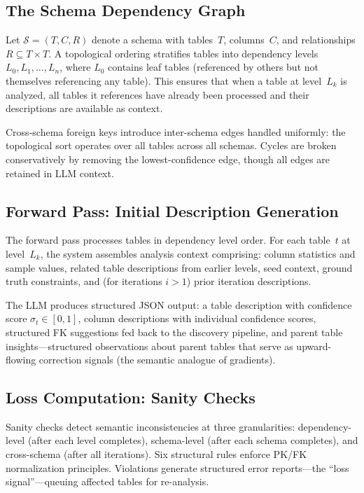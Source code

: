 \documentclass[twocolumn]{svjour3}
\begin{document}
\subsection{The Schema Dependency Graph}

Let $\mathcal{S} = (T, C, R)$ denote a schema with tables~$T$, columns~$C$, and relationships $R \subseteq T \times T$. A topological ordering stratifies tables into dependency levels $L_0, L_1, \ldots, L_n$, where $L_0$ contains leaf tables (referenced by others but not themselves referencing any table). This ensures that when a table at level~$L_k$ is analyzed, all tables it references have already been processed and their descriptions are available as context.

Cross-schema foreign keys introduce inter-schema edges handled uniformly: the topological sort operates over all tables across all schemas. Cycles are broken conservatively by removing the lowest-confidence edge, though all edges are retained in LLM context.

\subsection{Forward Pass: Initial Description Generation}

The forward pass processes tables in dependency level order. For each table~$t$ at level~$L_k$, the system assembles analysis context comprising: column statistics and sample values, related table descriptions from earlier levels, seed context, ground truth constraints, and (for iterations $i > 1$) prior iteration descriptions.

The LLM produces structured JSON output: a table description with confidence score $\sigma_t \in [0, 1]$, column descriptions with individual confidence scores, structured FK suggestions fed back to the discovery pipeline, and parent table insights---structured observations about parent tables that serve as upward-flowing correction signals (the semantic analogue of gradients).

\subsection{Loss Computation: Sanity Checks}

Sanity checks detect semantic inconsistencies at three granularities: dependency-level (after each level completes), schema-level (after each schema completes), and cross-schema (after all iterations). Six structural rules enforce PK/FK normalization principles. Violations generate structured error reports---the ``loss signal''---queuing affected tables for re-analysis.
\end{document}

